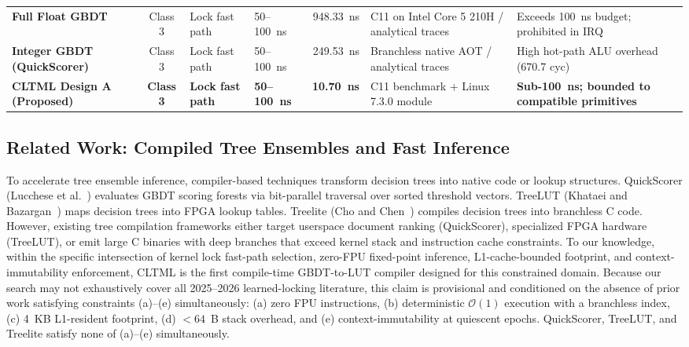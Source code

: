 \documentclass[conference]{IEEEtran}
\begin{document}
\begin{table}[t]
\begin{tabular}{lcllrll}
\textbf{Full Float GBDT} & Class 3 & Lock fast path & 50--100~ns & 948.33~ns & C11 on Intel Core 5 210H / analytical traces & Exceeds 100~ns budget; prohibited in IRQ \\
\textbf{Integer GBDT (QuickScorer)} & Class 3 & Lock fast path & 50--100~ns & 249.53~ns & Branchless native AOT / analytical traces & High hot-path ALU overhead (670.7 cyc) \\
\textbf{CLTML Design A (Proposed)} & \textbf{Class 3} & \textbf{Lock fast path} & \textbf{50--100~ns} & \textbf{10.70~ns} & C11 benchmark + Linux 7.3.0 module & \textbf{Sub-100~ns; bounded to compatible primitives} \\
\bottomrule
\end{tabular}
\end{table}

\subsection{Related Work: Compiled Tree Ensembles and Fast Inference}
To accelerate tree ensemble inference, compiler-based techniques transform decision trees into native code or lookup structures. QuickScorer (Lucchese et al.~\cite{lucchese2015quickscorer}) evaluates GBDT scoring forests via bit-parallel traversal over sorted threshold vectors. TreeLUT (Khataei and Bazargan~\cite{khataei2025treelut}) maps decision trees into FPGA lookup tables. Treelite (Cho and Chen~\cite{cho2020treelite}) compiles decision trees into branchless C code. However, existing tree compilation frameworks either target userspace document ranking (QuickScorer), specialized FPGA hardware (TreeLUT), or emit large C binaries with deep branches that exceed kernel stack and instruction cache constraints. To our knowledge, within the specific intersection of kernel lock fast-path selection, zero-FPU fixed-point inference, L1-cache-bounded footprint, and context-immutability enforcement, CLTML is the first compile-time GBDT-to-LUT compiler designed for this constrained domain. Because our search may not exhaustively cover all 2025--2026 learned-locking literature, this claim is provisional and conditioned on the absence of prior work satisfying constraints (a)--(e) simultaneously: (a) zero FPU instructions, (b) deterministic $\mathcal{O}(1)$ execution with a branchless index, (c) 4~KB L1-resident footprint, (d) $<64$~B stack overhead, and (e) context-immutability at quiescent epochs. QuickScorer, TreeLUT, and Treelite satisfy none of (a)--(e) simultaneously.
\end{document}
